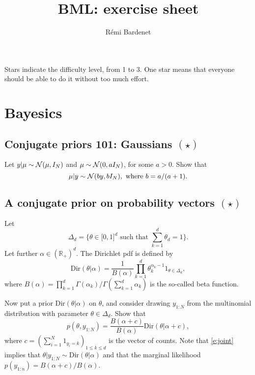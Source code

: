 \documentclass{article}
\title{BML: exercise sheet}
\date{}
\author{R\'emi Bardenet}
\newif\ifsolutions
\newcommand\solution[1]{
\ifsolutions
\begin{mdframed}[style=MyFrame]
\textcolor{bleu}{\textbf{Solution:} #1}
\end{mdframed}
\fi
}
\begin{document}
\maketitle

Stars indicate the difficulty level, from 1 to 3. One star means that everyone should be able to do it without too much effort.

\tableofcontents

\section{Bayesics}

\subsection{Conjugate priors 101: Gaussians $(\star)$}
\label{s:gaussianConjugacy}
Let $y\vert\mu \sim \mathcal{N}(\mu,I_N)$ and $\mu\sim \mathcal{N}(0,a I_N)$, for some $a>0$. Show that
\begin{equation}
  \mu\vert y \sim \mathcal{N}(b y,bI_N), \text{ where } b=a/(a+1).
  \label{e:gaussianConjugacy}
\end{equation}

\solution{
We apply Bayes' theorem and keep track of only the terms that will not end up in the normalization constant of the posterior. This gives
\begin{align*}
  \log p(\mu\vert y) &\propto \log p(y\vert\mu) + \log p(\mu)\\
  &\propto - \frac{\Vert y-\mu\Vert^2}{2} - \frac{\Vert \mu\Vert^2}{2a}\\
  & \propto -\frac12 \Vert\mu\Vert^2\left(1+\frac1a \right) + y^T\mu\\
  & \propto - \frac{\Vert \mu - by\Vert^2}{2b}.
\end{align*}
}

\subsection{A conjugate prior on probability vectors $(\star)$}
Let
$$
\Delta_d = \{\theta\in\mathbb[0,1]^d \text{ such that } \sum_{k=1}^d \theta_d = 1\}.
$$
Let further $\alpha\in(\mathbb{R}_+)^d$. The Dirichlet pdf is defined by
 $$
 \text{Dir}(\theta\vert \alpha) = \frac{1}{B(\alpha)} \prod_{k=1}^d \theta_k^{\alpha_k -1} 1_{\theta\in \Delta_d},$$
where
 $ B(\alpha) = \prod_{k=1}^d \Gamma(\alpha_k) / \Gamma(\sum_{k=1}^d \alpha_k)$
 is the so-called beta function.

 Now put a prior $\text{Dir}(\theta\vert \alpha)$ on $\theta$, and consider drawing $y_{1:N}$ from the multinomial distribution with parameter $\theta\in\Delta_d$. Show that
 \begin{equation}
   p(\theta, y_{1:N}) = \frac{B(\alpha+c)}{B(\alpha)} \text{Dir}(\theta\vert \alpha + c),
\label{e:joint}
 \end{equation}
 where $c=(\sum_{i=1}^N 1_{y_i=k})_{1\leq k \leq d}$ is the vector of counts. Note that \eqref{e:joint} implies that $\theta\vert y_{1:N} \sim \text{Dir}(\theta\vert \alpha)$ and that the marginal likelihood $p(y_{1:n}) = B(\alpha+c)/B(\alpha)$.
\end{document}
